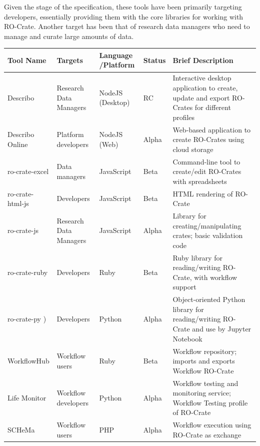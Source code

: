 Given the stage of the specification, these tools have been primarily
targeting developers, essentially providing them with the core libraries
for working with RO-Crate. Another target has been that of research data
managers who need to manage and curate large amounts of data.

\small
\begin{longtable}[]{@{}
  >{\raggedright\arraybackslash}p{}
  >{\raggedright\arraybackslash}p{}
  >{\raggedright\arraybackslash}p{}
  >{\raggedright\arraybackslash}p{}
  >{\raggedright\arraybackslash}p{}@{}}
\toprule
Tool Name & Targets & Language /Platform & Status & Brief Description \\
\midrule
\endhead
Describo \cite{ch5-78} &
Research Data Managers & NodeJS (Desktop) & RC & Interactive desktop
application to create, update and export RO-Crates for different
profiles \\
Describo Online
\cite{ch5-77} &
Platform developers & NodeJS (Web) & Alpha & Web-based application to
create RO-Crates using cloud storage \\
ro-crate-excel
\cite{ch5-84} & Data
managers & JavaScript & Beta & Command-line tool to create/edit
RO-Crates with spreadsheets \\
ro-crate-html-js
\cite{ch5-95} &
Developers & JavaScript & Beta & HTML rendering of RO-Crate \\
ro-crate-js
\cite{ch5-49} & Research
Data Managers & JavaScript & Alpha & Library for creating/manipulating
crates; basic validation code \\
ro-crate-ruby
\cite{Bacall 2022b} &
Developers & Ruby & Beta & Ruby library for reading/writing RO-Crate,
with workflow support \\
ro-crate-py \cite{ro-crate-py}) &
Developers & Python & Alpha & Object-oriented Python library for
reading/writing RO-Crate and use by Jupyter Notebook \\
WorkflowHub \cite{ch5-124} & Workflow
users & Ruby & Beta & Workflow repository; imports and exports Workflow
RO-Crate \\
Life Monitor \cite{CRS4 2022} & Workflow
developers & Python & Alpha & Workflow testing and monitoring service;
Workflow Testing profile of RO-Crate \\
SCHeMa \cite{ch5-118} & Workflow
users & PHP & Alpha & Workflow execution using RO-Crate as exchange

\end{longtable}
